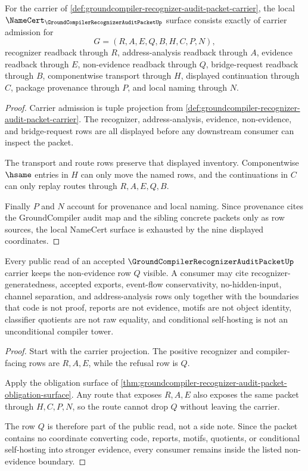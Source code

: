 \begin{theorem}
\label{thm:groundcompiler-recognizer-audit-packet-obligation-surface}
For the carrier of \autoref{def:groundcompiler-recognizer-audit-packet-carrier}, the local $\NameCert_{\GroundCompilerRecognizerAuditPacketUp}$ surface consists exactly of carrier admission for
$$
G=(R,A,E,Q,B,H,C,P,N),
$$
recognizer readback through $R$, address-analysis readback through $A$, evidence readback through $E$, non-evidence readback through $Q$, bridge-request readback through $B$, componentwise transport through $H$, displayed continuation through $C$, package provenance through $P$, and local naming through $N$.
\end{theorem}
\begin{proof}
Carrier admission is tuple projection from \autoref{def:groundcompiler-recognizer-audit-packet-carrier}. The recognizer, address-analysis, evidence, non-evidence, and bridge-request rows are all displayed before any downstream consumer can inspect the packet.

The transport and route rows preserve that displayed inventory. Componentwise $\hsame$ entries in $H$ can only move the named rows, and the continuations in $C$ can only replay routes through $R,A,E,Q,B$.

Finally $P$ and $N$ account for provenance and local naming. Since provenance cites the GroundCompiler audit map and the sibling concrete packets only as row sources, the local NameCert surface is exhausted by the nine displayed coordinates.
\end{proof}

\begin{theorem}
\label{thm:groundcompiler-recognizer-audit-packet-non-evidence-boundary}
Every public read of an accepted $\GroundCompilerRecognizerAuditPacketUp$ carrier keeps the non-evidence row $Q$ visible. A consumer may cite recognizer-generatedness, accepted exports, event-flow conservativity, no-hidden-input, channel separation, and address-analysis rows only together with the boundaries that code is not proof, reports are not evidence, motifs are not object identity, classifier quotients are not raw equality, and conditional self-hosting is not an unconditional compiler tower.
\end{theorem}
\begin{proof}
Start with the carrier projection. The positive recognizer and compiler-facing rows are $R,A,E$, while the refusal row is $Q$.

Apply the obligation surface of \autoref{thm:groundcompiler-recognizer-audit-packet-obligation-surface}. Any route that exposes $R,A,E$ also exposes the same packet through $H,C,P,N$, so the route cannot drop $Q$ without leaving the carrier.

The row $Q$ is therefore part of the public read, not a side note. Since the packet contains no coordinate converting code, reports, motifs, quotients, or conditional self-hosting into stronger evidence, every consumer remains inside the listed non-evidence boundary.
\end{proof}

